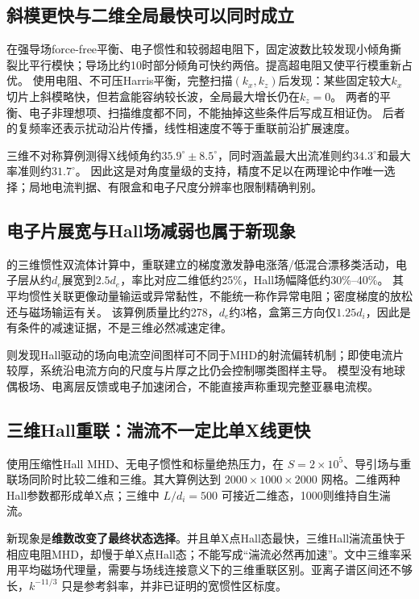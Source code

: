 \subsection{斜模更快与二维全局最快可以同时成立}
\citet{L224}在强导场force-free平衡、电子惯性和较弱超电阻下，固定波数比较发现小倾角撕裂比平行模快；导场比约10时部分倾角可快约两倍。提高超电阻又使平行模重新占优。
\citet{L268}使用电阻、不可压Harris平衡，完整扫描$(k_x,k_z)$后发现：某些固定较大$k_x$切片上斜模略快，但若盒能容纳较长波，全局最大增长仍在$k_z=0$。
两者的平衡、电子非理想项、扫描维度都不同，不能抽掉这些条件后写成互相证伪。
后者的复频率还表示扰动沿片传播，线性相速度不等于重联前沿扩展速度。

\citet{L166}三维不对称算例测得X线倾角约$35.9^\circ\pm8.5^\circ$，同时涵盖最大出流准则约$34.3^\circ$和最大率准则约$31.7^\circ$。
因此这是对角度量级的支持，精度不足以在两理论中作唯一选择；局地电流判据、有限盒和电子尺度分辨率也限制精确判别。

\subsection{电子片展宽与Hall场减弱也属于新现象}
\citet{L020}的三维惯性双流体计算中，重联建立的梯度激发静电涨落/低混合漂移类活动，电子层从约$d_e$展宽到$2.5d_e$，率比对应二维低约25\%，Hall场幅降低约30\%--40\%。
其平均惯性关联更像动量输运或异常黏性，不能统一称作异常电阻；密度梯度的放松还与磁场输运有关。
该算例质量比约278，$d_e$约3格，盒第三方向仅$1.25d_i$，因此是有条件的减速证据，不是三维必然减速定律。

\citet{L204}则发现Hall驱动的场向电流空间图样可不同于MHD的射流偏转机制；即使电流片较厚，系统沿电流方向的尺度与片厚之比仍会控制哪类图样主导。
模型没有地球偶极场、电离层反馈或电子加速闭合，不能直接声称重现完整亚暴电流楔。

\subsection{三维Hall重联：湍流不一定比单X线更快}
\citet{Huang2024}使用压缩性Hall MHD、无电子惯性和标量绝热压力，在 $S=2\times10^5$、导引场与重联场同阶时比较二维和三维。其大算例达到 $2000\times1000\times2000$ 网格。二维两种Hall参数都形成单X点；三维中 $L/d_i=500$ 可接近二维态，1000则维持自生湍流。

新现象是\textbf{维数改变了最终状态选择}。并且单X点Hall态最快，三维Hall湍流虽快于相应电阻MHD，却慢于单X点Hall态；不能写成“湍流必然再加速”。文中三维率采用平均磁场代理量，需要与场线连接意义下的三维重联区别。亚离子谱区间还不够长，$k^{-11/3}$ 只是参考斜率，并非已证明的宽惯性区标度。

